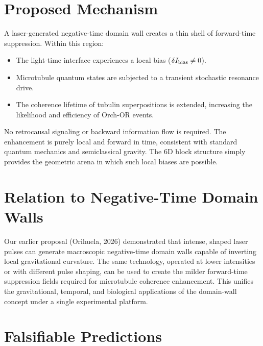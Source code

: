 \documentclass[11pt,a4paper]{article}
\begin{document}
\section{Proposed Mechanism}

A laser-generated negative-time domain wall creates a thin shell of forward-time suppression. Within this region:
\begin{itemize}
    \item The light-time interface experiences a local bias ($\delta I_{\rm bias} \neq 0$).
    \item Microtubule quantum states are subjected to a transient stochastic resonance drive.
    \item The coherence lifetime of tubulin superpositions is extended, increasing the likelihood and efficiency of Orch-OR events.
\end{itemize}

No retrocausal signaling or backward information flow is required. The enhancement is purely local and forward in time, consistent with standard quantum mechanics and semiclassical gravity. The 6D block structure simply provides the geometric arena in which such local biases are possible.

\section{Relation to Negative-Time Domain Walls}

Our earlier proposal (Orihuela, 2026) demonstrated that intense, shaped laser pulses can generate macroscopic negative-time domain walls capable of inverting local gravitational curvature. The same technology, operated at lower intensities or with different pulse shaping, can be used to create the milder forward-time suppression fields required for microtubule coherence enhancement. This unifies the gravitational, temporal, and biological applications of the domain-wall concept under a single experimental platform.

\section{Falsifiable Predictions}
\end{document}
